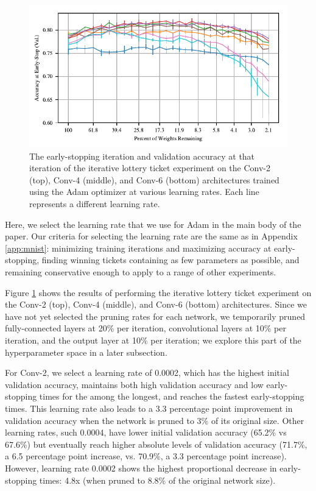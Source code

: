 \begin{figure}
\includegraphics[width=.5\textwidth]{graphs/cifar10/conv/adam_rate_sweep3/accuracy}
\caption{The early-stopping iteration and validation accuracy at that iteration  of the iterative lottery ticket experiment on the Conv-2 (top), Conv-4 (middle),
and Conv-6 (bottom) architectures trained using
the Adam optimizer at various learning rates. Each line represents a different learning rate.}
\label{fig:appendix-conv-adam}
\end{figure}

Here, we select the learning rate that we use for Adam in the main body of the paper. 
Our criteria for selecting the learning rate are the same as in Appendix \ref{app:mnist}: minimizing training iterations and maximizing accuracy at
early-stopping, finding winning tickets containing as few parameters as possible, and remaining conservative enough to apply to a range of other experiments.

Figure \ref{fig:appendix-conv-adam} shows the results of performing the iterative lottery ticket experiment on the Conv-2 (top), Conv-4 (middle), and Conv-6 (bottom)
architectures.
Since we have not yet selected the pruning rates for each network, we temporarily pruned fully-connected layers at 20\% per iteration, convolutional
layers at 10\% per iteration, and the output layer at 10\% per iteration; we explore this part of the hyperparameter space in a later subsection.

For Conv-2, we select a learning rate of 0.0002, which has the highest initial validation accuracy, maintains both high validation accuracy and low early-stopping times for
the among the longest, and reaches the fastest early-stopping times. This learning rate also leads to a 3.3 percentage point improvement
in validation accuracy when the network is pruned to 3\% of its original size. Other learning rates, such
0.0004, have lower initial validation accuracy (65.2\% vs 67.6\%) but eventually
reach higher absolute levels of validation accuracy (71.7\%, a 6.5 percentage point increase, vs. 70.9\%, a 3.3 percentage point increase). 
However, learning rate 0.0002
shows the highest proportional decrease in early-stopping times: 4.8x (when pruned to 8.8\% of the original network size).

